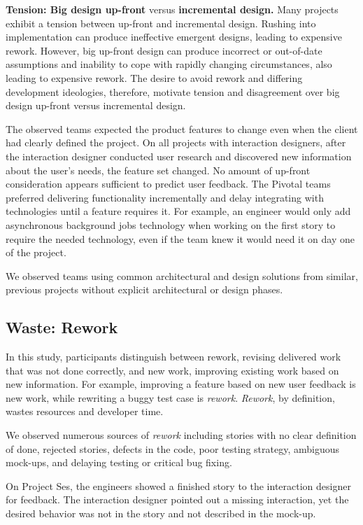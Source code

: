 \textbf{Tension:  Big design up-front} versus \textbf{incremental design.}
Many projects exhibit a tension between up-front and incremental design. Rushing into implementation can produce ineffective emergent designs, leading to expensive rework. However, big up-front design can produce incorrect or out-of-date assumptions and inability to cope with rapidly changing circumstances, also leading to expensive rework. The desire to avoid rework and differing development ideologies, therefore, motivate tension and disagreement over big design up-front versus incremental design. 

The observed teams expected the product features to change even when the client had clearly defined the project. On all projects with interaction designers, after the interaction designer conducted user research and discovered new information about the user's needs, the feature set changed. No amount of up-front consideration appears sufficient to predict user feedback. The Pivotal teams preferred delivering functionality incrementally and delay integrating with technologies until a feature requires it. For example, an engineer would only add asynchronous background jobs technology when working on the first story to require the needed technology, even if the team knew it would need it on day one of the project.

We observed teams using common architectural and design solutions from similar, previous projects without explicit architectural or design phases.
\subsection{Waste: Rework}
In this study, participants distinguish between rework, revising delivered work that was not done correctly, and new work, improving existing work based on new information. For example, improving a feature based on new user feedback is new work, while rewriting a buggy test case is \textit{rework}.  \textit{Rework}, by definition, wastes resources and developer time. 

We observed numerous sources of \textit{rework} including stories with no clear definition of done, rejected stories, defects in the code, poor testing strategy, ambiguous mock-ups, and delaying testing or critical bug fixing.

On Project Ses, the engineers showed a finished story to the interaction designer for feedback. The interaction designer pointed out a missing interaction, yet the desired behavior was not in the story and not described in the mock-up.

